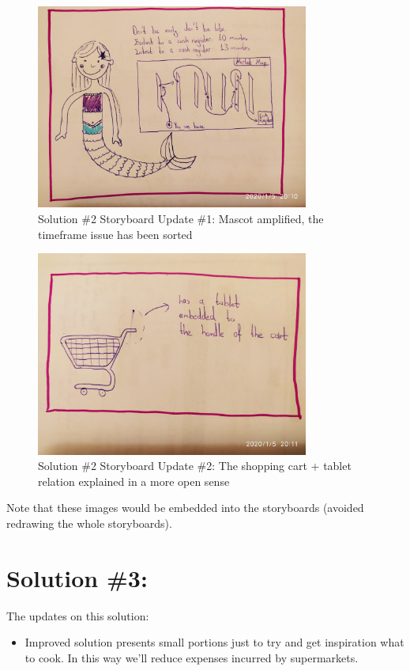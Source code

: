 \documentclass[a4paper,10pt,oneside]{scrreprt}
\begin{document}
\begin{figure}[H]
\centering
\includegraphics[width=0.8\textwidth, clip, trim={10em 8em 25em 0em}]{images/s2_p1.jpg}
\caption{Solution \#2 Storyboard Update \#1: \newline Mascot amplified, the timeframe issue has been sorted}
\end{figure}
\begin{figure}[H]
\centering
\includegraphics[width=0.8\textwidth, clip, trim={10em 50em 5em 20em}]{images/s2_p2.jpg}
\caption{Solution \#2 Storyboard Update \#2: \newline The shopping cart + tablet relation explained in a more open sense}
\end{figure}
\bigskip
\bigskip
Note that these images would be embedded into the storyboards (avoided redrawing the whole storyboards).

\section{Solution \#3:}
The updates on this solution:
\begin{itemize}
	\item Improved solution presents small portions just to try and get inspiration what to cook. In this way we'll reduce expenses incurred by supermarkets.

\end{itemize}
\end{document}
